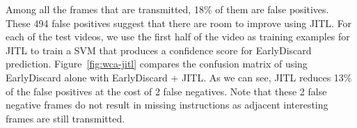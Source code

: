 Among all the frames that are transmitted, 18\% of them are false positives.
These 494 false positives suggest that there are room to improve using JITL. For
each of the test videos, we use the first half of the video as training examples
for JITL to train a SVM that produces a confidence score for EarlyDiscard
prediction. Figure~\ref{fig:wca-jitl} compares the confusion matrix of using
EarlyDiscard alone with EarlyDiscard + JITL. As we can see, JITL reduces 13\% of
the false positives at the cost of 2 false negatives. Note that these 2 false
negative frames do not result in missing instructions as adjacent interesting
frames are still transmitted. 


